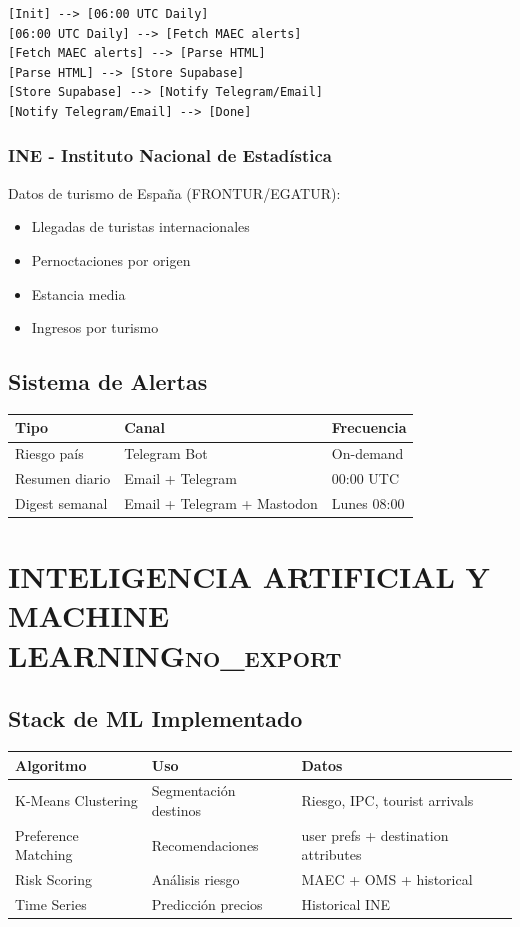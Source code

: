 \documentclass[11pt]{article}
\begin{document}
\begin{verbatim}
[Init] --> [06:00 UTC Daily]
[06:00 UTC Daily] --> [Fetch MAEC alerts]
[Fetch MAEC alerts] --> [Parse HTML]
[Parse HTML] --> [Store Supabase]
[Store Supabase] --> [Notify Telegram/Email]
[Notify Telegram/Email] --> [Done]
\end{verbatim}

\subsubsection{INE - Instituto Nacional de Estadística}
\label{sec:orgc96cf3b}

Datos de turismo de España (FRONTUR/EGATUR):
\begin{itemize}
\item Llegadas de turistas internacionales
\item Pernoctaciones por origen
\item Estancia media
\item Ingresos por turismo
\end{itemize}

\subsection{Sistema de Alertas}
\label{sec:org33cb02c}

\begin{center}
\begin{tabular}{lll}
Tipo & Canal & Frecuencia\\
\hline
Riesgo país & Telegram Bot & On-demand\\
Resumen diario & Email + Telegram & 00:00 UTC\\
Digest semanal & Email + Telegram + Mastodon & Lunes 08:00\\
\end{tabular}
\end{center}

\section{INTELIGENCIA ARTIFICIAL Y MACHINE LEARNING\hfill{}\textsc{no\_export}}
\label{sec:orgb426034}
\subsection{Stack de ML Implementado}
\label{sec:org5473f64}

\begin{center}
\begin{tabular}{lll}
Algoritmo & Uso & Datos\\
\hline
K-Means Clustering & Segmentación destinos & Riesgo, IPC, tourist arrivals\\
Preference Matching & Recomendaciones & user prefs + destination attributes\\
Risk Scoring & Análisis riesgo & MAEC + OMS + historical\\
Time Series & Predicción precios & Historical INE\\
\end{tabular}
\end{center}
\end{document}
